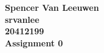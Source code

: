 \documentclass[12pt]{article}
\begin{document}
\begin{center}
{\Large\bf Spencer Van Leeuwen} \\ \vspace{2mm}
{\Large\bf srvanlee} \\ \vspace{2mm}
{\Large\bf 20412199} \\ \vspace{2mm}
{\Large\bf Assignment 0}
\end{center}
\end{document}
